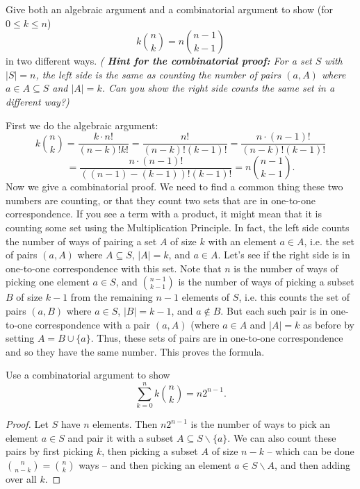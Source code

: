 \documentclass[11pt,dvipsnames]{book}
\numberwithin{equation}{section} %
\numberwithin{figure}{section} %
\numberwithin{table}{section} %
\begin{document}
\begin{exercise}
Give both an algebraic argument and a combinatorial argument to show (for $0 \leq k \leq n$)
\[k\binom{n}{k} = n\binom{n-1}{k-1}\]
in two different ways. {\it( {\bf Hint for the combinatorial proof:}  For a set $S$ with $|S|=n$, the left side is the same as counting the number of pairs $(a,A)$ where $a\in A\subseteq S$ and $|A|=k$. Can you show the right side counts the same set in a different way?)}

\begin{solution}
First we do the algebraic argument:
\[k\binom{n}{k} 
=\frac{k\cdot n!}{(n-k)!k!} = \frac{n!}{(n-k)!(k-1)!}  = \frac{n\cdot (n-1)!}{(n-k)!(k-1)!}\]
\[=\frac{n\cdot (n-1)!}{((n-1)-(k-1))!(k-1)!} = n\binom{n-1}{k-1}.
\]
Now we give a combinatorial proof. We need to find a common thing these two numbers are counting, or that they count two sets that are in one-to-one correspondence. If you see a term with a product, it might mean that it is counting some set using the Multiplication Principle. In fact, the left side counts the number of ways of pairing a set $A$ of size $k$ with an element $a\in A$, i.e. the set of pairs $(a,A)$ where $A\subseteq S$, $|A|=k$, and $a\in A$. Let's see if the right side is in one-to-one correspondence with this set. Note that $n$ is the number of ways of picking one element $a\in S$, and $\binom{n-1}{k-1}$ is the number of ways of picking a subset $B$ of size $k-1$ from the remaining $n-1$ elements of $S$, i.e. this counts the set of pairs $(a,B)$ where $a\in S$, $|B|=k-1$, and $a\not\in B$. But each such pair is in one-to-one correspondence with a pair $(a,A)$ (where $a\in A$ and $|A|=k$ as before by setting $A=B\cup \{a\}$. Thus, these sets of pairs are in one-to-one correspondence and so they have the same number. This proves the formula.

\end{solution}
\end{exercise}




\begin{exercise} Use a combinatorial argument to show
\[
\sum_{k=0}^{n} k{n\choose k} =n2^{n-1}.
\]

\begin{solution}
\begin{proof}
Let $S$ have $n$ elements. Then $n2^{n-1}$ is the number of ways to pick an element $a\in S$ and pair it with a subset $A\subseteq S\backslash \{a\}$. We can also count these pairs by first picking $k$, then picking a subset $A$ of size $n-k$ -- which can be done ${n\choose n-k}={n\choose k}$ ways -- and then picking an element $a\in S\backslash A$, and then adding over all $k$.
\end{proof}
\end{solution}
\end{exercise}
\end{document}
